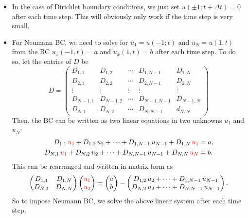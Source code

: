 \documentclass[11pt]{article}
\begin{document}
\begin{itemize}
  \item In the case of Dirichlet boundary conditions, we just set $u(\pm 1; t + \Delta t ) = 0$ after each time step.
    This will obviously only work if the time step is very small.

  \item For Neumann BC, we need to solve for $u_{1} = u(-1; t)$ and $u_{N} = u(1, t)$ from the BC $u_{x}(-1, t) = a$ and $u_{x}(1, t) = b$ after each time step.
    To do so, let the entries of $D$ be
  \begin{equation}
    D = 
    \begin{pmatrix}
      D_{1,1} & D_{1,2} & \cdots & D_{1,N-1} & D_{1,N}\\
      D_{2,1} & D_{2,2} & \cdots & D_{2,N-1} & D_{2,N}\\
      \vdots & \vdots & \vdots & \vdots & \vdots\\
      D_{N-1,1} & D_{N-1,2} & \cdots & D_{N-1,N-1} & D_{N-1,N}\\
      D_{N,1} & D_{N,2} & \cdots & D_{N,N-1} & d_{N,N}
    \end{pmatrix}
  \end{equation}
  Then, the BC can be written as two linear equations in two unknowns $u_{1}$ and $u_{N}$:
  \begin{equation}
    \begin{aligned}
      D_{1,1}\,{\color{red}u_{1}} + D_{1,2}\,u_{2} + \cdots + D_{1,N-1}\,u_{N-1} + D_{1,N}\,{\color{red}u_{1}} &= a,\\
      D_{N,1}\,{\color{red}u_{1}} + D_{N,2}\,u_{2} + \cdots + D_{N,N-1}\,u_{N-1} + D_{N,N}\,{\color{red}u_{N}} &= b.
    \end{aligned}
  \end{equation}
  This can be rearranged and written in matrix form as
  \begin{equation}
    \begin{pmatrix}
      D_{1,1} & D_{1,N}\\
      D_{N,1} & D_{N,N}\\
    \end{pmatrix}
    \begin{pmatrix}
      \color{red}
      u_{1}\\
      \color{red}
      u_{2}
    \end{pmatrix}
    =
    \begin{pmatrix}
      a\\
      b
    \end{pmatrix}
    -
    \begin{pmatrix}
      D_{1,2}\,u_{2} + \cdots + D_{1,N-1}\,u_{N-1}\\
      D_{N,2}\,u_{2} + \cdots + D_{N,N-1}\,u_{N-1}
    \end{pmatrix}.
  \end{equation}
  So to impose Neumann BC, we solve the above linear system after each time step.
\end{itemize}
\end{document}
